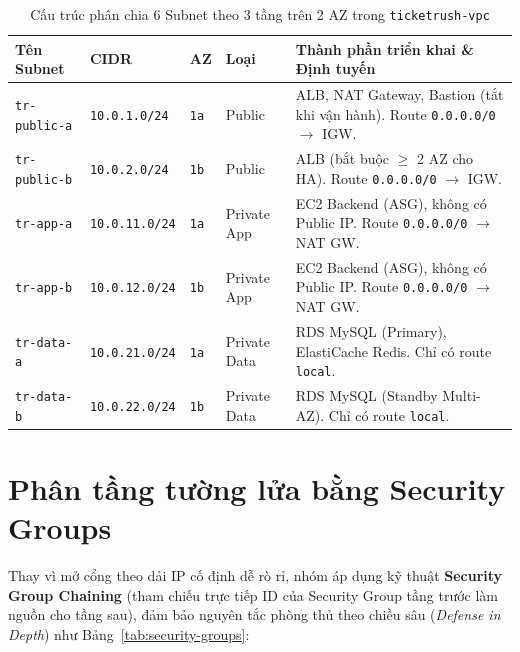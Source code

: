 \begin{table}[H]
  \centering
  \small
  \renewcommand{\arraystretch}{1.25}
  \begin{tabularx}{\textwidth}{l l l l X}
    \toprule
    \textbf{Tên Subnet} & \textbf{CIDR} & \textbf{AZ} & \textbf{Loại} & \textbf{Thành phần triển khai \& Định tuyến} \\
    \midrule
    \texttt{tr-public-a} & \texttt{10.0.1.0/24} & \texttt{1a} & Public & ALB, NAT Gateway, Bastion (tắt khi vận hành). Route \texttt{0.0.0.0/0} $\rightarrow$ IGW. \\
    \texttt{tr-public-b} & \texttt{10.0.2.0/24} & \texttt{1b} & Public & ALB (bắt buộc $\ge$ 2 AZ cho HA). Route \texttt{0.0.0.0/0} $\rightarrow$ IGW. \\
    \texttt{tr-app-a} & \texttt{10.0.11.0/24} & \texttt{1a} & Private App & EC2 Backend (ASG), không có Public IP. Route \texttt{0.0.0.0/0} $\rightarrow$ NAT GW. \\
    \texttt{tr-app-b} & \texttt{10.0.12.0/24} & \texttt{1b} & Private App & EC2 Backend (ASG), không có Public IP. Route \texttt{0.0.0.0/0} $\rightarrow$ NAT GW. \\
    \texttt{tr-data-a} & \texttt{10.0.21.0/24} & \texttt{1a} & Private Data & RDS MySQL (Primary), ElastiCache Redis. Chỉ có route \texttt{local}. \\
    \texttt{tr-data-b} & \texttt{10.0.22.0/24} & \texttt{1b} & Private Data & RDS MySQL (Standby Multi-AZ). Chỉ có route \texttt{local}. \\
    \bottomrule
  \end{tabularx}
  \caption{Cấu trúc phân chia 6 Subnet theo 3 tầng trên 2 AZ trong \texttt{ticketrush-vpc}}
  \label{tab:subnets}
\end{table}


\section{Phân tầng tường lửa bằng Security Groups}
Thay vì mở cổng theo dải IP cố định dễ rò rỉ, nhóm áp dụng kỹ thuật \textbf{Security Group Chaining} (tham chiếu trực tiếp ID của Security Group tầng trước làm nguồn cho tầng sau), đảm bảo nguyên tắc phòng thủ theo chiều sâu (\textit{Defense in Depth}) như Bảng~\ref{tab:security-groups}:

